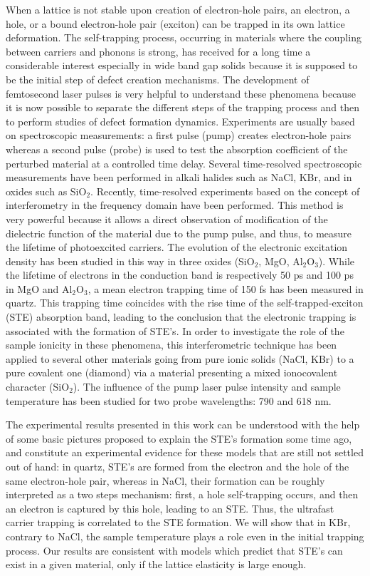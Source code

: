 \documentclass[aps,prb,reprint]{revtex4-2}
\begin{document}
When a lattice is not stable upon creation of electron-hole pairs, an electron, a hole, or a bound electron-hole pair (exciton) can be trapped in its own lattice deformation. The self-trapping process, occurring in materials where the coupling between carriers and phonons is strong, has received for a long time a considerable interest especially in wide band gap solids because it is supposed to be the initial step of defect creation mechanisms. The development of femtosecond laser pulses is very helpful to understand these phenomena because it is now possible to separate the different steps of the trapping process and then to perform studies of defect formation dynamics. Experiments are usually based on spectroscopic measurements: a first pulse (pump) creates electron-hole pairs whereas a second pulse (probe) is used to test the absorption coefficient of the perturbed material at a controlled time delay. Several time-resolved spectroscopic measurements have been performed in alkali halides such as NaCl,\cite{1} KBr,\cite{2} and in oxides such as SiO$_2$.\cite{3,4} Recently, time-resolved experiments based on the concept of interferometry in the frequency domain have been performed.\cite{5} This method is very powerful because it allows a direct observation of modification of the dielectric function of the material due to the pump pulse, and thus, to measure the lifetime of photoexcited carriers. The evolution of the electronic excitation density has been studied in this way in three oxides (SiO$_2$, MgO, Al$_2$O$_3$).\cite{6} While the lifetime of electrons in the conduction band is respectively 50 ps and 100 ps in MgO and Al$_2$O$_3$, a mean electron trapping time of 150 fs has been measured in quartz. This trapping time coincides with the rise time of the self-trapped-exciton (STE) absorption band, leading to the conclusion that the electronic trapping is associated with the formation of STE's.\cite{4} In order to investigate the role of the sample ionicity in these phenomena, this interferometric technique has been applied to several other materials going from pure ionic solids (NaCl, KBr) to a pure covalent one (diamond) via a material presenting a mixed ionocovalent character (SiO$_2$). The influence of the pump laser pulse intensity and sample temperature has been studied for two probe wavelengths: 790 and 618 nm.

The experimental results presented in this work can be understood with the help of some basic pictures proposed to explain the STE's formation some time ago, and constitute an experimental evidence for these models that are still not settled out of hand:\cite{7} in quartz, STE's are formed from the electron and the hole of the same electron-hole pair, whereas in NaCl, their formation can be roughly interpreted as a two steps mechanism: first, a hole self-trapping occurs, and then an electron is captured by this hole, leading to an STE. Thus, the ultrafast carrier trapping is correlated to the STE formation. We will show that in KBr, contrary to NaCl, the sample temperature plays a role even in the initial trapping process. Our results are consistent with models which predict that STE's can exist in a given material, only if the lattice elasticity is large enough.\cite{8}
\end{document}
